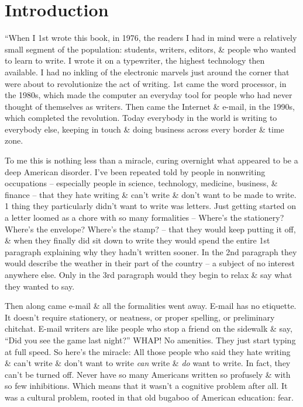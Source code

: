 \documentclass{article}
\begin{document}

\section*{Introduction}
``When I 1st wrote this book, in 1976, the readers I had in mind were a relatively small segment of the population: students, writers, editors, \& people who wanted to learn to write. I wrote it on a typewriter, the highest technology then available. I had no inkling of the electronic marvels just around the corner that were about to revolutionize the act of writing. 1st came the word processor, in the 1980s, which made the computer an everyday tool for people who had never thought of themselves as writers. Then came the Internet \& e-mail, in the 1990s, which completed the revolution. Today everybody in the world is writing to everybody else, keeping in touch \& doing business across every border \& time zone.

To me this is nothing less than a miracle, curing overnight what appeared to be a deep American disorder. I've been repeated told by people in nonwriting occupations -- especially people in science, technology, medicine, business, \& finance -- that they hate writing \& can't write \& don't want to be made to write. 1 thing they particularly didn't want to write was letters. Just getting started on a letter loomed as a chore with so many formalities -- Where's the stationery? Where's the envelope? Where's the stamp? -- that they would keep putting it off, \& when they finally did sit down to write they would spend the entire 1st paragraph explaining why they hadn't written sooner. In the 2nd paragraph they would describe the weather in their part of the country -- a subject of no interest anywhere else. Only in the 3rd paragraph would they begin to relax \& say what they wanted to say.

Then along came e-mail \& all the formalities went away. E-mail has no etiquette. It doesn't require stationery, or neatness, or proper spelling, or preliminary chitchat. E-mail writers are like people who stop a friend on the sidewalk \& say, ``Did you see the game last night?'' WHAP! No amenities. They just start typing at full speed. So here's the miracle: All those people who said they hate writing \& can't write \& don't want to write \textit{can} write \& \textit{do} want to write. In fact, they can't be turned off. Never have so many Americans written so profusely \& with so few inhibitions. Which means that it wasn't a cognitive problem after all. It was a cultural problem, rooted in that old bugaboo of American education: fear.
\end{document}
